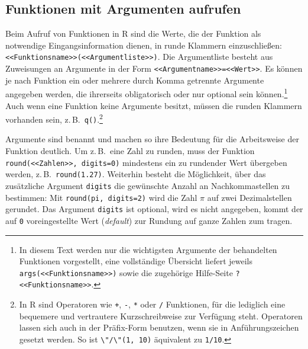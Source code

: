 \subsection{Funktionen mit Argumenten aufrufen}
\label{sec:funcParam}

Beim Aufruf von Funktionen in R sind die Werte, die der Funktion als notwendige Eingangsinformation dienen, in runde Klammern einzuschließen: \lstinline!<<Funktionsname>>(<<Argumentliste>>)!. Die Argumentliste besteht aus Zuweisungen an Argumente in der Form \lstinline!<<Argumentname>>=<<Wert>>!. Es können je nach Funktion ein oder mehrere durch Komma getrennte Argumente angegeben werden, die ihrerseits obligatorisch oder nur optional sein können.\footnote{In diesem Text werden nur die wichtigsten Argumente der behandelten Funktionen vorgestellt, eine vollständige Übersicht liefert jeweils \lstinline!args(<<Funktionsname>>)! sowie die zugehörige Hilfe-Seite \lstinline!?<<Funktionsname>>!.} Auch wenn eine Funktion keine Argumente besitzt, müssen die runden Klammern vorhanden sein, z.\,B.\ \lstinline!q()!.\footnote{\label{ftn:functional}In R sind Operatoren wie \lstinline!+!, \lstinline!-!, \lstinline!*! oder \lstinline!/! Funktionen, für die lediglich eine bequemere und vertrautere Kurzschreibweise zur Verfügung steht. Operatoren lassen sich auch in der Präfix-Form benutzen, wenn sie in Anführungszeichen gesetzt werden. So ist \lstinline!\"/\"(1, 10)! äquivalent zu \lstinline!1/10!.}

Argumente sind benannt und machen so ihre Bedeutung für die Arbeitsweise der Funktion deutlich. Um z.\,B.\ eine Zahl zu runden, muss der Funktion \lstinline!round(<<Zahlen>>, digits=0)! mindestens ein zu rundender Wert übergeben werden, z.\,B.\ \lstinline!round(1.27)!. Weiterhin besteht die Möglichkeit, über das zusätzliche Argument \lstinline!digits! die gewünschte Anzahl an Nachkommastellen zu bestimmen: Mit \lstinline!round(pi, digits=2)! wird die Zahl $\pi$ auf zwei Dezimalstellen gerundet. Das Argument \lstinline!digits! ist optional, wird es nicht angegeben, kommt der auf \lstinline!0! voreingestellte Wert (\emph{default}) zur Rundung auf ganze Zahlen zum tragen.

